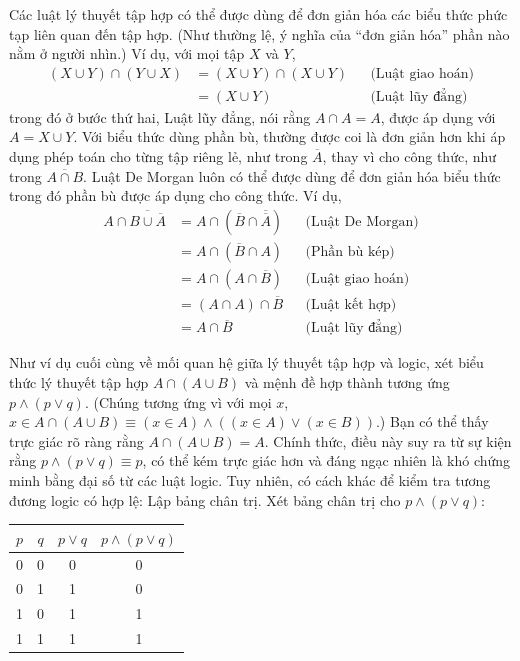 Các luật lý thuyết tập hợp có thể được dùng để đơn giản hóa các biểu thức phức tạp liên quan đến tập hợp. (Như thường lệ, ý nghĩa của ``đơn giản hóa'' phần nào nằm ở người nhìn.) Ví dụ, với mọi tập $X$ và $Y$,
\begin{align*}
(X \cup Y) \cap (Y \cup X) &= (X \cup Y) \cap (X \cup Y) & &\text{(Luật giao hoán)} \\
&= (X \cup Y) & &\text{(Luật lũy đẳng)}
\end{align*}
trong đó ở bước thứ hai, Luật lũy đẳng, nói rằng $A \cap A = A$, được áp dụng với $A = X \cup Y$. Với biểu thức dùng phần bù, thường được coi là đơn giản hơn khi áp dụng phép toán cho từng tập riêng lẻ, như trong $\overline{A}$, thay vì cho công thức, như trong $\overline{A \cap B}$. Luật De Morgan luôn có thể được dùng để đơn giản hóa biểu thức trong đó phần bù được áp dụng cho công thức. Ví dụ,
\begin{align*}
A \cap \overline{B \cup \overline{A}} &= A \cap (\overline{B} \cap \overline{\overline{A}}) & &\text{(Luật De Morgan)} \\
&= A \cap (\overline{B} \cap A) & &\text{(Phần bù kép)} \\
&= A \cap (A \cap \overline{B}) & &\text{(Luật giao hoán)} \\
&= (A \cap A) \cap \overline{B} & &\text{(Luật kết hợp)} \\
&= A \cap \overline{B} & &\text{(Luật lũy đẳng)}
\end{align*}

Như ví dụ cuối cùng về mối quan hệ giữa lý thuyết tập hợp và logic, xét biểu thức lý thuyết tập hợp $A \cap (A \cup B)$ và mệnh đề hợp thành tương ứng $p \land (p \lor q)$. (Chúng tương ứng vì với mọi $x$, $x \in A \cap (A \cup B) \equiv (x \in A) \land ((x \in A) \lor (x \in B))$.) Bạn có thể thấy trực giác rõ ràng rằng $A \cap (A \cup B) = A$. Chính thức, điều này suy ra từ sự kiện rằng $p \land (p \lor q) \equiv p$, có thể kém trực giác hơn và đáng ngạc nhiên là khó chứng minh bằng đại số từ các luật logic. Tuy nhiên, có cách khác để kiểm tra tương đương logic có hợp lệ: Lập bảng chân trị. Xét bảng chân trị cho $p \land (p \lor q)$:

\begin{center}
\begin{tabular}{cc|c|c}
$p$ & $q$ & $p \lor q$ & $p \land (p \lor q)$ \\
\hline
0 & 0 & 0 & 0 \\
0 & 1 & 1 & 0 \\
1 & 0 & 1 & 1 \\
1 & 1 & 1 & 1 \\
\end{tabular}
\end{center}

